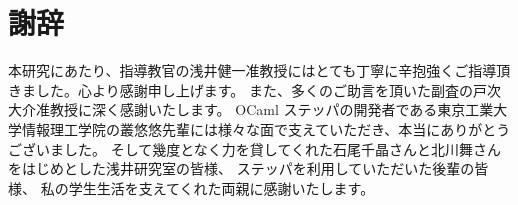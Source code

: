 \chapter*{謝辞}

本研究にあたり、指導教官の浅井健一准教授にはとても丁寧に辛抱強くご指導頂きました。心より感謝申し上げます。
また、多くのご助言を頂いた副査の戸次大介准教授に深く感謝いたします。
OCaml ステッパの開発者である東京工業大学情報理工学院の叢悠悠先輩には様々な面で支えていただき、本当にありがとうございました。
そして幾度となく力を貸してくれた石尾千晶さんと北川舞さんをはじめとした浅井研究室の皆様、
ステッパを利用していただいた後輩の皆様、
私の学生生活を支えてくれた両親に感謝いたします。
